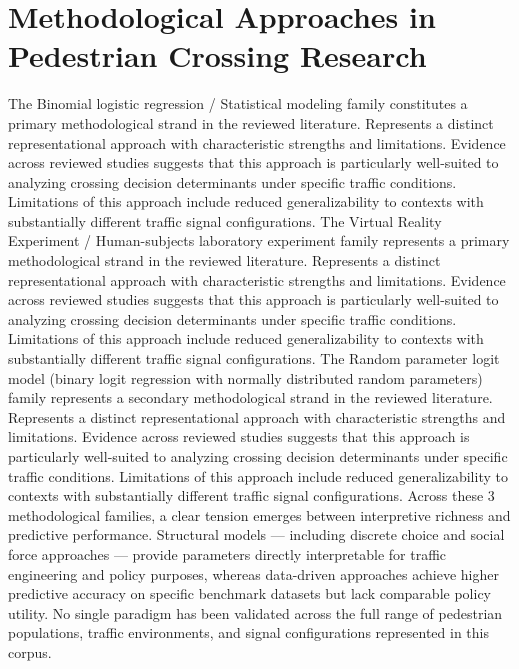\documentclass{article}
\begin{document}
\section{Methodological Approaches in Pedestrian Crossing Research}
The Binomial logistic regression / Statistical modeling family constitutes a primary methodological strand in the reviewed literature. Represents a distinct representational approach with characteristic strengths and limitations. Evidence across reviewed studies suggests that this approach is particularly well-suited to analyzing crossing decision determinants under specific traffic conditions. Limitations of this approach include reduced generalizability to contexts with substantially different traffic signal configurations. The Virtual Reality Experiment / Human-subjects laboratory experiment family represents a primary methodological strand in the reviewed literature. Represents a distinct representational approach with characteristic strengths and limitations. Evidence across reviewed studies suggests that this approach is particularly well-suited to analyzing crossing decision determinants under specific traffic conditions. Limitations of this approach include reduced generalizability to contexts with substantially different traffic signal configurations. The Random parameter logit model (binary logit regression with normally distributed random parameters) family represents a secondary methodological strand in the reviewed literature. Represents a distinct representational approach with characteristic strengths and limitations. Evidence across reviewed studies suggests that this approach is particularly well-suited to analyzing crossing decision determinants under specific traffic conditions. Limitations of this approach include reduced generalizability to contexts with substantially different traffic signal configurations. Across these 3 methodological families, a clear tension emerges between interpretive richness and predictive performance. Structural models — including discrete choice and social force approaches — provide parameters directly interpretable for traffic engineering and policy purposes, whereas data-driven approaches achieve higher predictive accuracy on specific benchmark datasets but lack comparable policy utility. No single paradigm has been validated across the full range of pedestrian populations, traffic environments, and signal configurations represented in this corpus.
\end{document}
